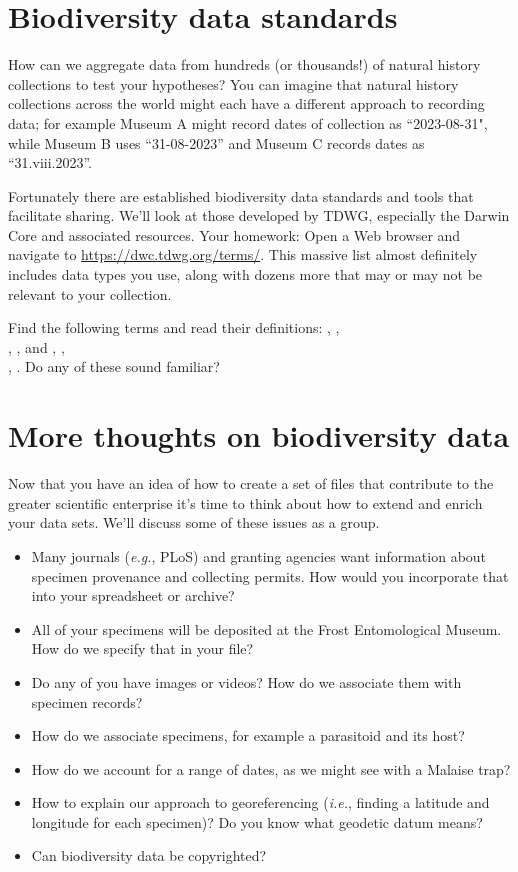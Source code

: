 \section*{Biodiversity data standards}
How can we aggregate data from hundreds (or thousands!) of natural history collections to test your hypotheses? You can imagine that natural history collections across the world might each have a different approach to recording data; for example Museum A might record dates of collection as ``2023-08-31", while Museum B uses ``31-08-2023'' and Museum C records dates as ``31.viii.2023''.\vspace{3mm}

\noindent{}Fortunately there are established biodiversity data standards and tools that facilitate sharing. We'll look at those developed by TDWG, especially the Darwin Core and associated resources. Your homework: Open a Web browser and navigate to \url{https://dwc.tdwg.org/terms/}. This massive list almost definitely includes data types you use, along with dozens more that may or may not be relevant to your collection.\vspace{3mm}

\noindent{}Find the following terms and read their definitions: , , \\, ,  and , , \\,  . Do any of these sound familiar?\vspace{3mm}

\section*{More thoughts on biodiversity data}
Now that you have an idea of how to create a set of files that contribute to the greater scientific enterprise it's time to think about how to extend and enrich your data sets. We'll discuss some of these issues as a group.
\begin{itemize}
\item Many journals (\textit{e.g.}, PLoS) and granting agencies want information about specimen provenance and collecting permits. How would you incorporate that into your spreadsheet or archive?
\item All of your specimens will be deposited at the Frost Entomological Museum. How do we specify that in your file?
\item Do any of you have images or videos? How do we associate them with specimen records?
\item How do we associate specimens, for example a parasitoid and its host? 
\item How do we account for a range of dates, as we might see with a Malaise trap?
\item How to explain our approach to georeferencing (\textit{i.e.}, finding a latitude and longitude for each specimen)? Do you know what geodetic datum means?
\item Can biodiversity data be copyrighted?
\end{itemize}


